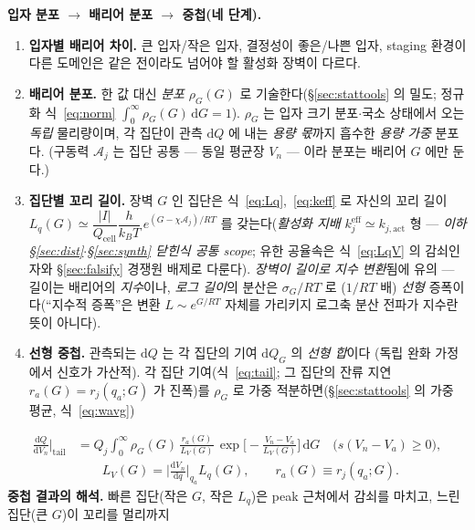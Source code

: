 \documentclass[11pt,a4paper]{article}
\newcommand{\dd}{\mathrm{d}}
\newcommand{\eff}{\mathrm{eff}}
\newcommand{\cell}{\mathrm{cell}}
\begin{document}
\textbf{입자 분포 $\to$ 배리어 분포 $\to$ 중첩(네 단계).}
\begin{enumerate}[label=\textbf{(\alph*)},leftmargin=2.2em,itemsep=2pt]
\item \textbf{입자별 배리어 차이.} 큰 입자/작은 입자, 결정성이 좋은/나쁜 입자, staging 환경이 다른 도메인은
  같은 전이라도 넘어야 할 활성화 장벽이 다르다.
\item \textbf{배리어 분포.} 한 값 대신 \emph{분포} $\rho_G(G)$ 로 기술한다(\S\ref{sec:stattools} 의 밀도;
  정규화 식~\eqref{eq:norm} $\int_0^\infty\rho_G(G)\,\dd G=1$). $\rho_G$ 는 입자 크기 분포$\cdot$국소 상태에서
  오는 \emph{독립} 물리량이며, 각 집단이 관측 $\dd Q$ 에 내는 \emph{용량 몫}까지 흡수한 \emph{용량 가중} 분포다. (구동력 $\mathcal A_j$ 는 집단 공통 —
  동일 평균장 $V_n$ — 이라 분포는 배리어 $G$ 에만 둔다.)
\item \textbf{집단별 꼬리 길이.} 장벽 $G$ 인 집단은 식~\eqref{eq:Lq},~\eqref{eq:keff} 로 자신의 꼬리
  길이 $L_{q}(G)\simeq\dfrac{|I|}{Q_\cell}\dfrac{h}{k_BT}\,e^{(G-\chi\mathcal A_j)/RT}$ 를 갖는다(\emph{활성화 지배}
  $k_j^{\eff}\simeq k_{j,\mathrm{act}}$ 형 — \emph{이하 \S\ref{sec:dist}$\cdot$\S\ref{sec:synth} 닫힌식 공통 scope};
  유한 공율속은 식~\eqref{eq:LqV} 의 감쇠인자와 \S\ref{sec:falsify} 경쟁원 배제로 다룬다). \emph{장벽이 길이로
  지수 변환}됨에 유의 — 길이는 배리어의 \emph{지수}이나, \emph{로그 길이}의 분산은 $\sigma_G/RT$ 로 ($1/RT$ 배)
  \emph{선형} 증폭이다(``지수적 증폭''은 변환 $L\!\sim\!e^{G/RT}$ 자체를 가리키지 로그축 분산 전파가 지수란 뜻이 아니다).
\item \textbf{선형 중첩.} 관측되는 $\dd Q$ 는 각 집단의 기여 $\dd Q_G$ 의 \emph{선형 합}이다
  (독립 완화 가정에서 신호가 가산적). 각 집단 기여(식~\eqref{eq:tail}; 그 집단의 잔류 지연 $r_a(G)=r_j(q_a;G)$ 가
  진폭)를 $\rho_G$ 로 가중 적분하면(\S\ref{sec:stattools} 의 가중 평균, 식~\eqref{eq:wavg})
\end{enumerate}
\begin{equation}
\boxed{\;\begin{aligned}
\frac{\dd Q}{\dd V_n}\Big|_{\text{tail}}&=Q_j\!\int_0^\infty\!\rho_G(G)\,\frac{r_a(G)}{L_V(G)}\,
\exp\!\Big[-\frac{V_n-V_a}{L_V(G)}\Big]\,\dd G\quad\big(s(V_n-V_a)\ge0\big),\\[2pt]
&\qquad L_V(G)=\Big|\frac{\dd V_n}{\dd q}\Big|_{q_a}\!\!L_q(G),\qquad r_a(G)\equiv r_j(q_a;G).
\end{aligned}\;}
\label{eq:superpose}
\end{equation}
\textbf{중첩 결과의 해석.} 빠른 집단(작은 $G$, 작은 $L_q$)은 peak 근처에서 감쇠를 마치고, 느린 집단(큰 $G$)이 꼬리를 멀리까지
\end{document}
